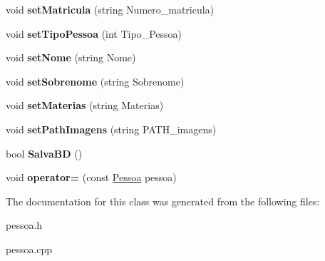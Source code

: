 \begin{DoxyCompactItemize}
\item 
void {\bfseries set\+Matricula} (string Numero\+\_\+matricula)\hypertarget{classPessoa_a0e2ce6288aac2ff7e1b81b07549e4c9c}{}\label{classPessoa_a0e2ce6288aac2ff7e1b81b07549e4c9c}

\item 
void {\bfseries set\+Tipo\+Pessoa} (int Tipo\+\_\+\+Pessoa)\hypertarget{classPessoa_a236f3c30200f576a92938dc4c0f5933f}{}\label{classPessoa_a236f3c30200f576a92938dc4c0f5933f}

\item 
void {\bfseries set\+Nome} (string Nome)\hypertarget{classPessoa_a17bb95aa9e46059422fcec28da0fefaa}{}\label{classPessoa_a17bb95aa9e46059422fcec28da0fefaa}

\item 
void {\bfseries set\+Sobrenome} (string Sobrenome)\hypertarget{classPessoa_a3f82e17ab976f36237481dc1c8bfa749}{}\label{classPessoa_a3f82e17ab976f36237481dc1c8bfa749}

\item 
void {\bfseries set\+Materias} (string Materias)\hypertarget{classPessoa_a87b4a73b0ff94d7e92788ea9a0b36f67}{}\label{classPessoa_a87b4a73b0ff94d7e92788ea9a0b36f67}

\item 
void {\bfseries set\+Path\+Imagens} (string P\+A\+T\+H\+\_\+imagens)\hypertarget{classPessoa_aeacd523f2c365994a9ad28cd5d6b4cd0}{}\label{classPessoa_aeacd523f2c365994a9ad28cd5d6b4cd0}

\item 
bool {\bfseries Salva\+BD} ()\hypertarget{classPessoa_a72462ac2c329a84d544437998b2536b9}{}\label{classPessoa_a72462ac2c329a84d544437998b2536b9}

\item 
void {\bfseries operator=} (const \hyperlink{classPessoa}{Pessoa} pessoa)\hypertarget{classPessoa_a61ebd05535b48f5c653e1ba03409e1c0}{}\label{classPessoa_a61ebd05535b48f5c653e1ba03409e1c0}

\end{DoxyCompactItemize}


The documentation for this class was generated from the following files\+:\begin{DoxyCompactItemize}
\item 
pessoa.\+h\item 
pessoa.\+cpp\end{DoxyCompactItemize}
